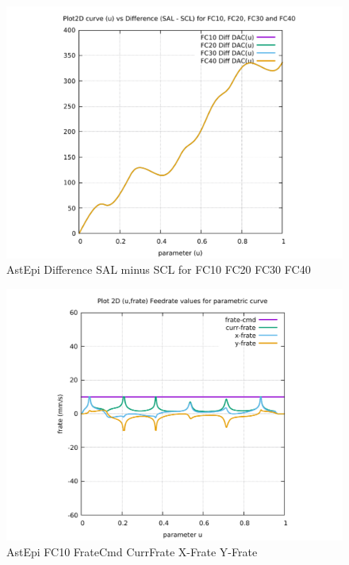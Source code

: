 \begin{figure}
	\caption     {AstEpi Difference SAL minus SCL for FC10 FC20 FC30 FC40}
	\label{26-img-AstEpi-Difference-SAL-minus-SCL-for-FC10-FC20-FC30-FC40.pdf}
\includegraphics[width=1.00\textwidth]{Chap4/appendix/app-AstEpi/plots/26-img-AstEpi-Difference-SAL-minus-SCL-for-FC10-FC20-FC30-FC40.pdf}
\end{figure}


\clearpage
\pagebreak

\begin{figure}
	\caption     {AstEpi FC10 FrateCmd CurrFrate X-Frate Y-Frate}
	\label{27-img-AstEpi-FC10-FrateCmd-CurrFrate-X-Frate-Y-Frate.pdf}
\includegraphics[width=1.00\textwidth]{Chap4/appendix/app-AstEpi/plots/27-img-AstEpi-FC10-FrateCmd-CurrFrate-X-Frate-Y-Frate.pdf}
\end{figure}


